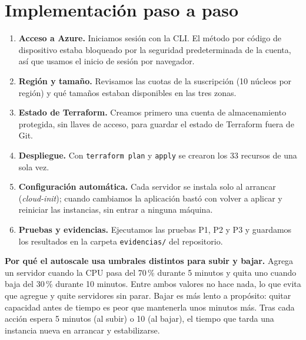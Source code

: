 \section{Implementación paso a paso}
\begin{enumerate}
  \item \textbf{Acceso a Azure.} Iniciamos sesión con la CLI. El método por código de dispositivo
        estaba bloqueado por la seguridad predeterminada de la cuenta, así que usamos el inicio
        de sesión por navegador.
  \item \textbf{Región y tamaño.} Revisamos las cuotas de la suscripción (10 núcleos por región)
        y qué tamaños estaban disponibles en las tres zonas.
  \item \textbf{Estado de Terraform.} Creamos primero una cuenta de almacenamiento protegida, sin
        llaves de acceso, para guardar el estado de Terraform fuera de Git.
  \item \textbf{Despliegue.} Con \texttt{terraform plan} y \texttt{apply} se crearon los 33 recursos
        de una sola vez.
  \item \textbf{Configuración automática.} Cada servidor se instala solo al arrancar
        (\emph{cloud-init}); cuando cambiamos la aplicación bastó con volver a aplicar y reiniciar
        las instancias, sin entrar a ninguna máquina.
  \item \textbf{Pruebas y evidencias.} Ejecutamos las pruebas P1, P2 y P3 y guardamos los resultados
        en la carpeta \texttt{evidencias/} del repositorio.
\end{enumerate}

\textbf{Por qué el autoscale usa umbrales distintos para subir y bajar.} Agrega un servidor cuando
la CPU pasa del 70\,\% durante 5 minutos y quita uno cuando baja del 30\,\% durante 10 minutos.
Entre ambos valores no hace nada, lo que evita que agregue y quite servidores sin parar. Bajar es
más lento a propósito: quitar capacidad antes de tiempo es peor que mantenerla unos minutos más.
Tras cada acción espera 5 minutos (al subir) o 10 (al bajar), el tiempo que tarda una instancia
nueva en arrancar y estabilizarse.

